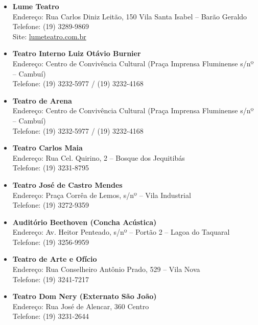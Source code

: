 \begin{itemize}
    \item   \textbf{Lume Teatro}
        \\Endereço:  Rua Carlos Diniz Leitão, 150 Vila Santa Isabel -- Barão Geraldo
        \\Telefone: (19) 3289-9869
        \\Site: \url{lumeteatro.com.br}

    \item   \textbf{Teatro Interno Luiz Otávio Burnier}
        \\Endereço: Centro de Convivência Cultural (Praça Imprensa Fluminense s/nº -- Cambuí)
        \\Telefone: (19) 3232-5977 / (19) 3232-4168

    \item   \textbf{Teatro de Arena}
        \\Endereço: Centro de Convivência Cultural (Praça Imprensa Fluminense s/nº -- Cambuí)
        \\Telefone: (19) 3232-5977 / (19) 3232-4168

    \item   \textbf{Teatro Carlos Maia}
        \\Endereço: Rua Cel. Quirino, 2 -- Bosque dos Jequitibás
        \\Telefone: (19) 3231-8795

    \item   \textbf{Teatro José de Castro Mendes}
        \\Endereço: Praça Corrêa de Lemos, s/nº -- Vila Industrial
        \\Telefone: (19) 3272-9359

    \item   \textbf{Auditório Beethoven (Concha Acústica)}
        \\Endereço: Av. Heitor Penteado, s/nº -- Portão 2 -- Lagoa do Taquaral
        \\Telefone: (19) 3256-9959

    \item   \textbf{Teatro de Arte e Ofício}
        \\Endereço: Rua Conselheiro Antônio Prado, 529 -- Vila Nova
        \\Telefone: (19) 3241-7217

    \item   \textbf{Teatro Dom Nery (Externato São João)}
        \\Endereço: Rua José de Alencar, 360  Centro
        \\Telefone: (19) 3231-2644


\end{itemize}

